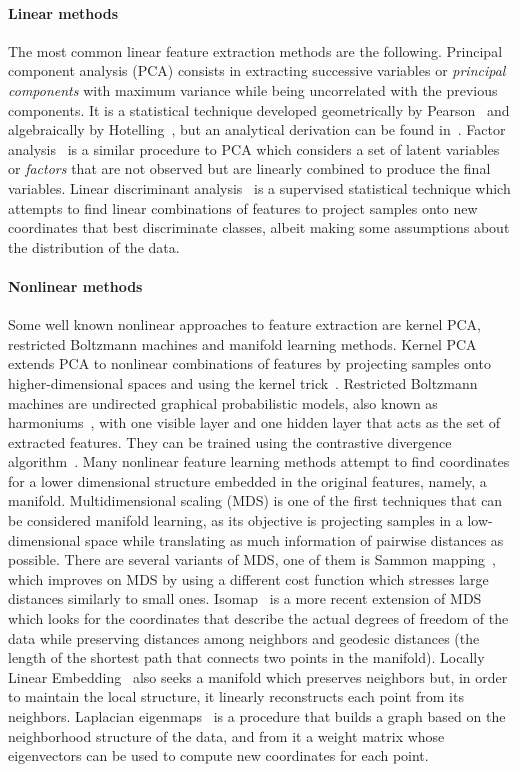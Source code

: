 \paragraph{Linear methods} The most common linear feature extraction methods are the following. Principal component analysis (PCA) consists in extracting successive variables or \textit{principal components} with maximum variance while being uncorrelated with the previous components. It is a statistical technique developed geometrically by Pearson~ and algebraically by Hotelling~, but an analytical derivation can be found in~. Factor analysis~ is a similar procedure to PCA which considers a set of latent variables or \textit{factors} that are not observed but are linearly combined to produce the final variables. Linear discriminant analysis~ is a supervised statistical technique which attempts to find linear combinations of features to project samples onto new coordinates that best discriminate classes, albeit making some assumptions about the distribution of the data. 

\paragraph{Nonlinear methods} Some well known nonlinear approaches to feature extraction are kernel PCA, restricted Boltzmann machines and manifold learning methods. Kernel PCA~ extends PCA to nonlinear combinations of features by projecting samples onto higher-dimensional spaces and using the kernel trick~. Restricted Boltzmann machines are undirected graphical probabilistic models, also known as harmoniums~, with one visible layer and one hidden layer that acts as the set of extracted features. They can be trained using the contrastive divergence algorithm~. Many nonlinear feature learning methods attempt to find coordinates for a lower dimensional structure embedded in the original features, namely, a manifold. Multidimensional scaling (MDS) is one of the first techniques that can be considered manifold learning, as its objective is projecting samples in a low-dimensional space while translating as much information of pairwise distances as possible. There are several variants of MDS, one of them is Sammon mapping~, which improves on MDS by using a different cost function which stresses large distances similarly to small ones. Isomap~ is a more recent extension of MDS which looks for the coordinates that describe the actual degrees of freedom of the data while preserving distances among neighbors and geodesic distances (the length of the shortest path that connects two points in the manifold). Locally Linear Embedding~ also seeks a manifold which preserves neighbors but, in order to maintain the local structure, it linearly reconstructs each point from its neighbors. Laplacian eigenmaps~ is a procedure that builds a graph based on the neighborhood structure of the data, and from it a weight matrix whose eigenvectors can be used to compute new coordinates for each point.

